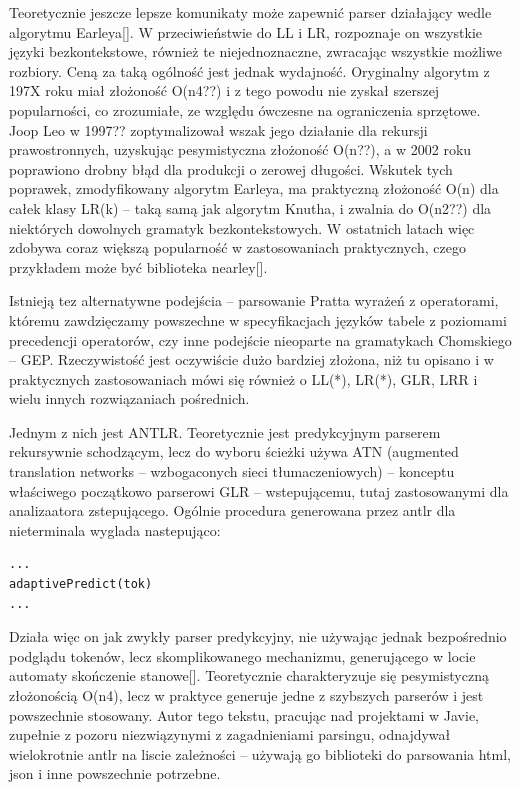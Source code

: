 Teoretycznie jeszcze lepsze komunikaty może zapewnić parser działający wedle algorytmu Earleya[]. W przeciwieństwie do LL i LR, rozpoznaje on wszystkie języki bezkontekstowe, również te niejednoznaczne, zwracając wszystkie możliwe rozbiory. Ceną za taką ogólność jest jednak wydajność. Oryginalny algorytm z 197X roku miał złożoność O(n4??) i z tego powodu nie zyskał szerszej popularności, co zrozumiałe, ze względu ówczesne na ograniczenia sprzętowe. Joop Leo w 1997?? zoptymalizował wszak jego działanie dla rekursji prawostronnych, uzyskując pesymistyczna złożoność O(n??), a w 2002 roku poprawiono drobny błąd dla produkcji o zerowej długości. Wskutek tych poprawek, zmodyfikowany algorytm Earleya, ma praktyczną złożoność O(n) dla całek klasy LR(k) – taką samą jak algorytm Knutha, i zwalnia do O(n2??) dla niektórych dowolnych gramatyk bezkontekstowych. W ostatnich latach więc zdobywa coraz większą popularność w zastosowaniach praktycznych, czego przykładem może być biblioteka nearley[].

Istnieją tez alternatywne podejścia – parsowanie Pratta wyrażeń z operatorami, któremu zawdzięczamy powszechne w specyfikacjach języków tabele z poziomami precedencji operatorów, czy inne podejście nieoparte na gramatykach Chomskiego – GEP. Rzeczywistość jest oczywiście dużo bardziej złożona, niż tu opisano i w praktycznych zastosowaniach mówi się również o LL(*), LR(*), GLR, LRR i wielu innych rozwiązaniach pośrednich.

Jednym z nich jest ANTLR. Teoretycznie jest predykcyjnym parserem rekursywnie schodzącym, lecz do wyboru ścieżki używa ATN (augmented translation networks – wzbogaconych sieci tłumaczeniowych) – konceptu właściwego początkowo parserowi GLR – wstepującemu, tutaj zastosowanymi dla analizaatora zstepującego.
Ogólnie procedura generowana przez antlr dla nieterminala wyglada nastepująco:
\begin{lstlisting}
...
adaptivePredict(tok)
...
\end{lstlisting}
Działa więc on jak zwykły parser predykcyjny, nie używając jednak bezpośrednio podglądu tokenów, lecz skomplikowanego mechanizmu, generującego w locie automaty skończenie stanowe[]. Teoretycznie charakteryzuje się pesymistyczną złożonością O(n4), lecz w praktyce generuje jedne z szybszych parserów i jest powszechnie stosowany. Autor tego tekstu, pracując nad projektami w Javie, zupełnie z pozoru niezwiązynymi z zagadnieniami parsingu, odnajdywał wielokrotnie antlr na liscie zależności – używają go biblioteki do parsowania html, json i inne powszechnie potrzebne.

